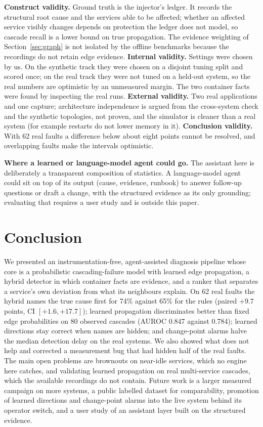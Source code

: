 \documentclass[journal]{IEEEtran}
\begin{document}
\textbf{Construct validity.} Ground truth is the injector's ledger. It records the structural root cause and the services able to be affected; whether an affected
service visibly changes depends on protection the ledger does not model, so cascade recall is a lower bound on true propagation. The evidence weighting of
Section~\ref{sec:graph} is not isolated by the offline benchmarks because the recordings do not retain edge evidence.
\textbf{Internal validity.} Settings were chosen by us. On the synthetic track they were chosen on a disjoint tuning split and scored once; on the real track they were not
tuned on a held-out system, so the real numbers are optimistic by an unmeasured margin. The two container facts were found by inspecting the real runs.
\textbf{External validity.} Two real applications and one capture; architecture independence is argued from the cross-system check and the synthetic topologies,
not proven, and the simulator is cleaner than a real system (for example restarts do not lower memory in it). \textbf{Conclusion validity.} With 62 real faults a
difference below about eight points cannot be resolved, and overlapping faults make the intervals optimistic.

\textbf{Where a learned or language-model agent could go.} The assistant here is deliberately a transparent composition of statistics. A language-model agent could
sit on top of its output (cause, evidence, runbook) to answer follow-up questions or draft a change, with the structured evidence as its only grounding; evaluating that
requires a user study and is outside this paper.

\section{Conclusion}
We presented an instrumentation-free, agent-assisted diagnosis pipeline whose core is a probabilistic cascading-failure model with learned edge propagation, a
hybrid detector in which container facts are evidence, and a ranker that separates a service's own deviation from what its neighbours explain. On 62 real faults the
hybrid names the true cause first for 74\% against 65\% for the rules (paired $+9.7$ points, CI $[+1.6,+17.7]$); learned propagation discriminates better than fixed
edge probabilities on 80 observed cascades (AUROC 0.847 against 0.784); learned directions stay correct when names are hidden; and change-point alarms halve the median
detection delay on the real systems. We also showed what does not help and corrected a measurement bug that had hidden half of the real faults. The main open problems are
brownouts on near-idle services, which no engine here catches, and validating learned propagation on real multi-service cascades, which the available recordings do not contain.
Future work is a larger measured campaign on more systems, a public labelled dataset for comparability, promotion of learned directions and change-point alarms into the
live system behind its operator switch, and a user study of an assistant layer built on the structured evidence.

\clearpage


\end{document}
